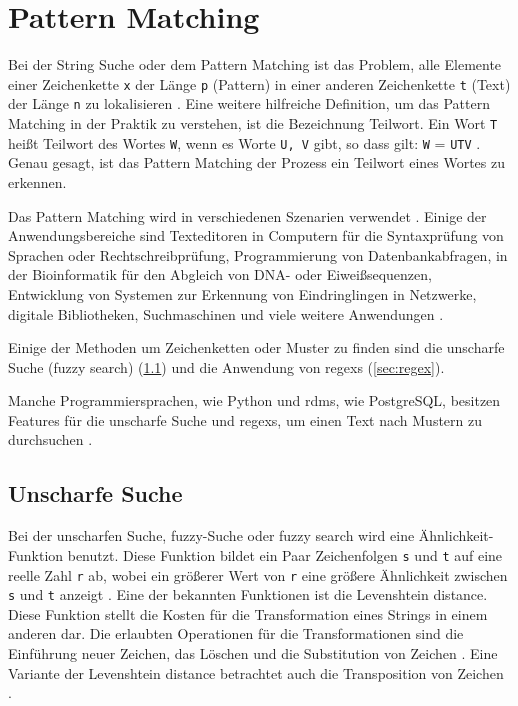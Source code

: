 \section{Pattern Matching} \label{subsec:pattmatch}

Bei der String Suche oder dem Pattern Matching ist das Problem, alle Elemente einer Zeichenkette \texttt{x} der Länge \texttt{p} (Pattern) in einer anderen Zeichenkette \texttt{t} (Text) der Länge \texttt{n} zu lokalisieren \cite{patternmatchingapostolico}. Eine weitere hilfreiche Definition, um das Pattern Matching in der Praktik zu verstehen, ist die Bezeichnung \glqq Teilwort\grqq{}. \glqq Ein Wort \texttt{T} heißt Teilwort des Wortes \texttt{W}, wenn es Worte \texttt{U, V} gibt, so dass gilt: \texttt{W} = \texttt{UTV}\grqq{} \cite{teilwort}. Genau gesagt, ist das Pattern Matching der Prozess ein Teilwort eines Wortes zu erkennen.

Das Pattern Matching wird in verschiedenen Szenarien verwendet \cite{patternmatchingapps}. Einige der Anwendungsbereiche sind Texteditoren in Computern für die Syntaxprüfung von Sprachen oder Rechtschreibprüfung, Programmierung von Datenbankabfragen, in der Bioinformatik für den Abgleich von DNA- oder Eiweißsequenzen, Entwicklung von Systemen zur Erkennung von Eindringlingen in Netzwerke, digitale Bibliotheken, Suchmaschinen und viele weitere Anwendungen \cite{patternmatchingapps, patternmatchingeffi, regexconf}.

Einige der Methoden um Zeichenketten oder Muster zu finden sind die unscharfe Suche (fuzzy search) (\ref{sub:levdist}) und die Anwendung von \acp{regex} (\ref{sec:regex}).

Manche Programmiersprachen, wie Python und \ac{rdms}, wie PostgreSQL, besitzen Features für die unscharfe Suche und \acp{regex}, um einen Text nach Mustern zu durchsuchen \cite{ patternmatchingpostgres, thefuzzlib}.

\subsection{Unscharfe Suche} \label{sub:levdist}

Bei der unscharfen Suche, fuzzy-Suche oder fuzzy search wird eine Ähnlichkeit-Funktion benutzt. Diese Funktion bildet ein Paar Zeichenfolgen \texttt{s} und \texttt{t} auf eine reelle Zahl \texttt{r} ab, wobei ein größerer Wert von \texttt{r} eine größere Ähnlichkeit zwischen \texttt{s} und \texttt{t} anzeigt \cite{stringsearch2}. Eine der bekannten Funktionen ist die \glqq Levenshtein distance\grqq{}. Diese Funktion stellt die Kosten für die Transformation eines Strings in einem anderen dar. Die erlaubten Operationen für die Transformationen sind die Einführung neuer Zeichen, das Löschen und die Substitution von Zeichen \cite{stringsearch2}. Eine Variante der \glqq Levenshtein distance\grqq{} betrachtet auch die Transposition von Zeichen \cite{thefuzzyalgo}.

